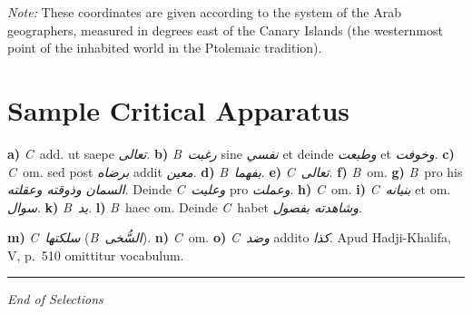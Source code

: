 \documentclass[11pt,a4paper]{article}
\newcommand{\B}{\textit{B}}
\newcommand{\C}{\textit{C}}
\begin{document}
\textit{Note:} These coordinates are given according to the system of the Arab geographers, measured in degrees east of the Canary Islands (the westernmost point of the inhabited world in the Ptolemaic tradition).



\clearpage








\section{Sample Critical Apparatus}



\begin{footnotesize}

\noindent\textbf{a)} \C\ add. ut saepe \textit{تعالى}. \textbf{b)} \B\ \textit{رغبت} sine \textit{نفسي} et deinde \textit{وطبعت} et \textit{وخوفت}. \textbf{c)} \C\ om. sed post \textit{برضاه} addit \textit{معين}. \textbf{d)} \B\ \textit{بفهما}. \textbf{e)} \C\ \textit{تعالى}. \textbf{f)} \B\ om. \textbf{g)} \B\ pro his \textit{السمان} \textit{وذوقته وعقلته}. Deinde \C\ \textit{وعليت} pro \textit{وعملت}. \textbf{h)} \C\ om. \textbf{i)} \C\ \textit{بنيانه} et om. \textit{سوال}. \textbf{k)} \B\ \textit{يد}. \textbf{l)} \B\ haec om. Deinde \C\ habet \textit{وشاهدته بفصول}.



\vspace{0.3cm}



\noindent\textbf{m)} \C\ \textit{سلكتها} (\B\ \textit{السُّخى}). \textbf{n)} \C\ om. \textbf{o)} \C\ \textit{وضد} addito \textit{كذا}. Apud Hadji-Khalifa, V, p.~510 omittitur vocabulum.

\end{footnotesize}



\vspace{0.5cm}



\noindent\rule{\textwidth}{0.4pt}



\begin{center}

\textit{End of Selections}

\end{center}
\end{document}
